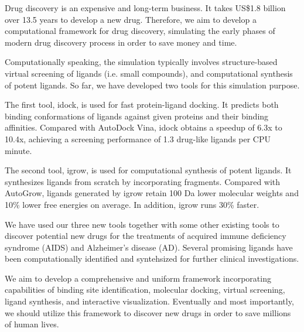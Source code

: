 Drug discovery is an expensive and long-term business. It takes US\$1.8 billion over 13.5 years to develop a new drug. Therefore, we aim to develop a computational framework for drug discovery, simulating the early phases of modern drug discovery process in order to save money and time.

Computationally speaking, the simulation typically involves structure-based virtual screening of ligands (i.e. small compounds), and computational synthesis of potent ligands. So far, we have developed two tools for this simulation purpose.

The first tool, idock, is used for fast protein-ligand docking. It predicts both binding conformations of ligands against given proteins and their binding affinities. Compared with AutoDock Vina, idock obtains a speedup of 6.3x to 10.4x, achieving a screening performance of 1.3 drug-like ligands per CPU minute.

The second tool, igrow, is used for computational synthesis of potent ligands. It synthesizes ligands from scratch by incorporating fragments. Compared with AutoGrow, ligands generated by igrow retain 100 Da lower molecular weights and 10\% lower free energies on average. In addition, igrow runs 30\% faster.

We have used our three new tools together with some other existing tools to discover potential new drugs for the treatments of acquired immune deficiency syndrome (AIDS) and Alzheimer's disease (AD). Several promising ligands have been computationally identified and syntehsized for further clinical investigations.

We aim to develop a comprehensive and uniform framework incorporating capabilities of binding site identification, molecular docking, virtual screening, ligand synthesis, and interactive visualization. Eventually and most importantly, we should utilize this framework to discover new drugs in order to save millions of human lives.
